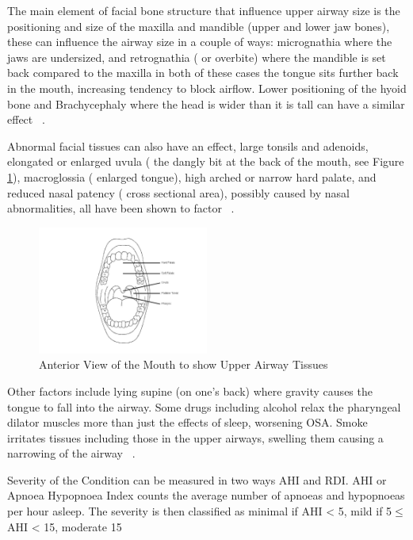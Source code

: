 The main element of facial bone structure that influence upper airway size is the positioning and size of the maxilla and mandible (upper and lower jaw bones), these can influence the airway size in a couple of ways: micrognathia where the jaws are undersized, and retrognathia ( or overbite) where the mandible is set back compared to the maxilla in both of these cases the tongue sits further back in the mouth, increasing tendency to block airflow. Lower positioning of the hyoid bone and Brachycephaly where the head is wider than it is tall can have a similar effect ~\cite{lowel1995cephalometric}.

Abnormal facial tissues can also have an effect, large tonsils and adenoids, elongated or enlarged uvula ( the dangly bit at the back of the mouth, see Figure \ref{fig:Anterior-View-Mouth}), macroglossia ( enlarged tongue), high arched or narrow hard palate, and reduced nasal patency ( cross sectional area), possibly caused by nasal abnormalities, all have been shown to factor ~\cite{schwab1995upper}.

\begin{figure}[h]
\centering
\includegraphics[width=0.5\textwidth]{drawings/Anterior-View-Mouth}
\caption{Anterior View of the Mouth to show Upper Airway Tissues~\cite{anteriormouth}}
\label{fig:Anterior-View-Mouth}
\end{figure}

Other factors include lying supine (on one’s back) where gravity causes the tongue to fall into the airway. Some drugs including alcohol relax the pharyngeal dilator muscles more than just the effects of sleep, worsening OSA. Smoke irritates tissues including those in the upper airways, swelling them causing a narrowing of the airway ~\cite{apneosotherfactors}.

 Severity of the Condition can be measured in two ways AHI and RDI. AHI or Apnoea Hypopnoea Index counts the average number of apnoeas and hypopnoeas per hour asleep. The severity is then classified as minimal if AHI < 5, mild if 5$\leq$ AHI < 15, moderate 15%

